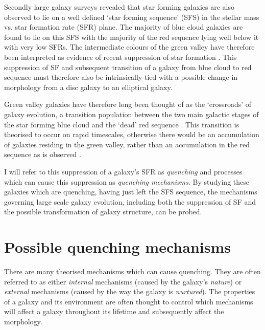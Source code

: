 Secondly large galaxy surveys revealed that star forming galaxies are also observed to lie on a well defined `star forming sequence' (SFS) in the stellar mass vs. star formation rate (SFR) plane. The majority of blue cloud galaxies are found to lie on this SFS with the majority of the red sequence lying well below it with very low SFRs. The intermediate colours of the green valley have therefore been interpreted as evidence of recent suppression of star formation \citep[SF;][]{Salim07}. This suppression of SF and subsequent transition of a galaxy from blue cloud to red sequence must therefore also be intrinsically tied with a possible change in morphology from a disc galaxy to an elliptical galaxy.

Green valley galaxies have therefore long been thought of as the `crossroads' of galaxy evolution, a transition population between the two main galactic stages of the star forming blue cloud and the `dead' red sequence \citep{Bell04, Wyder07, Schim07, Martin07, Faber07, Mendez11, Gonc12, schawinski14, Pan14}. This transition is theorised to occur on rapid timescales, otherwise there would be an accumulation of galaxies residing in the green valley, rather than an accumulation in the red sequence as is observed \citep{Arnouts07, Martin07}.

I will refer to this suppression of a galaxy's SFR as \emph{quenching} and processes which can cause this suppression as \emph{quenching mechanisms}. By studying these galaxies which are quenching, having just left the SFS sequence, the mechanisms governing large scale galaxy evolution, including both the suppression of SF and the possible transformation of galaxy structure, can be probed. 

\section{Possible quenching mechanisms}\label{sec:quenchmech}

There are many theorised mechanisms which can cause quenching. They are often referred to as either \emph{internal} mechanisms (caused by the galaxy's \emph{nature}) or \emph{external} mechanisms (caused by the way the galaxy is \emph{nurtured}). The properties of a galaxy and its environment are often thought to control which mechanisms will affect a galaxy throughout its lifetime and subsequently affect the morphology. 

